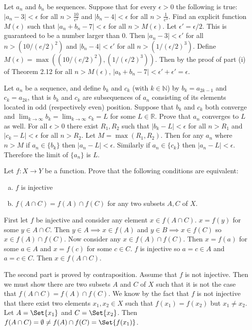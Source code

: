 \documentclass[paper=a4, fontsize=11pt]{jhwhw} %
\begin{document}
Let ${a_n}$ and ${b_n}$ be sequences. Suppose that for every $\epsilon > 0$ the following is true: $|a_n - 3| < \epsilon$ for all $n > \frac{10}{e^2}$ and $|b_n - 4| < \epsilon$ for all $n> \frac{1}{e^3}$. Find an explicit function $M(\epsilon)$ such that $|a_n + b_n - 7| < \epsilon$ for all $n > M(\epsilon)$. 
\solution
Let $\epsilon' = \epsilon/2$. This is guaranteed to be a number larger than 0. Then $|a_n - 3| < \epsilon'$ for all $n > (10/(e/2)^2)$ and $|b_n - 4| < \epsilon'$ for all $n > (1/(\epsilon/2)^3)$. Define $M(\epsilon) = \max((10/(e/2)^2), (1/(\epsilon/2)^3))$. Then by the proof of part (i) of Theorem 2.12 for all $n > M(\epsilon)$, $|a_b + b_n - 7| < \epsilon' + \epsilon' = \epsilon$. 

Let ${a_n}$ be a sequence, and define $b_k$ and $c_k$ (with $k\in \mathbb N$) by $b_k = a_{2k-1}$ and $c_k = a_{2k}$, that is ${b_k}$ and ${c_k}$ are subsequences of ${a_n}$ consisting of its elements located in odd (respectively even) position. Suppose that ${b_k}$ and ${c_k}$ both converge and $\lim_{k\to \infty}b_k = \lim_{k\to \infty}c_k = L$ for some $L\in \mathbb R$. Prove that ${a_n}$ converges to $L$ as well. 
\solution
For all $\epsilon > 0$ there exist $R_1, R_2$ such that $|b_k - L| < \epsilon$ for all $n > R_1$ and $|c_k - L| < \epsilon$ for all $n > R_2$. Let $M = \max(R_1, R_2)$. Then for any $a_n$ where $n > M$ if $a_n\in \{b_k\}$ then $|a_n - L| < \epsilon$. Similarly if $a_n\in \{c_k\}$ then $|a_n - L| < \epsilon$. Therefore the limit of $\{a_n\}$ is $L$.

Let $f: X\to Y$ be a function. Prove that the following conditions are equivalent:
\begin{enumerate}[(a)]
    \item $f$ is injective
    \item $f(A\cap C) = f(A)\cap f(C)$ for any two subsets $A, C$ of $X$.
\end{enumerate}
\solution
First let $f$ be injective and consider any element $x\in f(A\cap C)$. $x = f(y)$ for some $y\in A\cap C$. Then $y\in A\implies x\in f(A)$ and $y\in B\implies x\in f(C)$ so $x\in f(A)\cap f(C)$. Now consider any $x\in f(A)\cap f(C)$. Then $x = f(a)$ for some $a\in A$ and $x = f(c)$ for some $c\in C$. $f$ is injective so $a = c\in A$ and $a=c\in C$. Then $x\in f(A\cap C)$. 

The second part is proved by contraposition. Assume that $f$ is not injective. Then we must show there are two subsets $A$ and $C$ of $X$ such that it is not the case that $f(A\cap C) = f(A) \cap f(C)$. We know by the fact that $f$ is not injective that there exist two elements $x_1, x_2\in X$ such that $f(x_1) = f(x_2)$ but $x_1 \not= x_2$. Let $A=\Set{x_1}$ and $C = \Set{x_2}$. Then $f(A\cap C) = \emptyset \not= f(A) \cap f(C) = \Set{f(x_1)}$. 
\end{document}
